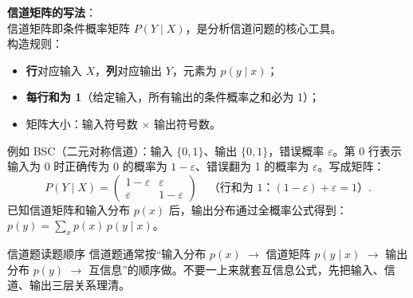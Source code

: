 \noindent \textbf{信道矩阵的写法}：\\[2pt]
信道矩阵即条件概率矩阵 $P(Y\mid X)$，是分析信道问题的核心工具。\\
构造规则：
\begin{itemize}
  \item \textbf{行}对应输入 $X$，\textbf{列}对应输出 $Y$，元素为 $p(y\mid x)$；
  \item \textbf{每行和为 1}（给定输入，所有输出的条件概率之和必为 1）；
  \item 矩阵大小：输入符号数 $\times$ 输出符号数。
\end{itemize}
例如 BSC（二元对称信道）：输入 $\{0,1\}$、输出 $\{0,1\}$，错误概率 $\varepsilon$。第 0 行表示输入为 0 时正确传为 0 的概率为 $1-\varepsilon$、错误翻为 1 的概率为 $\varepsilon$。写成矩阵：
\[
P(Y\mid X) = \begin{pmatrix}
1-\varepsilon & \varepsilon \\
\varepsilon    & 1-\varepsilon
\end{pmatrix}
\quad\text{（行和为 1：$(1-\varepsilon)+\varepsilon=1$）}.
\]
已知信道矩阵和输入分布 $p(x)$ 后，输出分布通过全概率公式得到：$p(y)=\sum_x p(x)\,p(y\mid x)$。

\begin{hintBox}{信道题读题顺序}
信道题通常按“输入分布 $p(x)$ $\to$ 信道矩阵 $p(y\mid x)$ $\to$ 输出分布 $p(y)$ $\to$ 互信息”的顺序做。不要一上来就套互信息公式，先把输入、信道、输出三层关系理清。
\end{hintBox}

